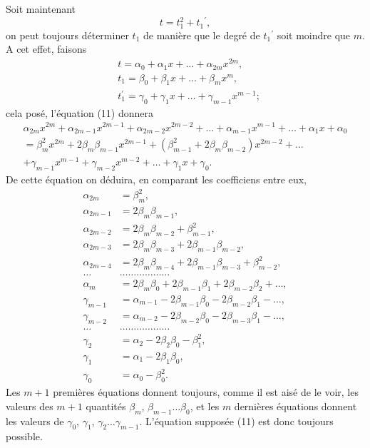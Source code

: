 \documentclass[oneside, 12 pt, leqno]{memoir}
\begin{document}
Soit maintenant
\[\tag{11}t=t_1^2+{t_1}^{\prime},\]
on peut toujours déterminer \(t_1\) de manière que le degré de \(t_1{ }^{\prime}\) soit moindre que \(m\). A cet effet, faisons
\[\begin{aligned}
& t=\alpha_0+\alpha_1 x+\dots+\alpha_{2 m} x^{2 m}, \\
& t_1=\beta_0+\beta_1 x+\dots+\beta_m x^m, \\
& t_1^{\prime}=\gamma_0+\gamma_1 x+\dots+\gamma_{m-1} x^{m-1};
\end{aligned}\]
cela posé, l'équation (11) donnera
\[\begin{gathered}
\alpha_{2 m} x^{2 m}+\alpha_{2 m-1} x^{2 m-1}+\alpha_{2 m-2} x^{2 m-2}+\dots+\alpha_{m-1} x^{m-1}+\dots+\alpha_1 x+\alpha_0 \\
=\beta_m^2 x^{2 m}+2 \beta_m \beta_{m-1} x^{2 m-1}+\left(\beta_{m-1}^2+2 \beta_m \beta_{m-2}\right) x^{2 m-2}+\dots \\
+\gamma_{m-1} x^{m-1}+\gamma_{m-2} x^{m-2}+\dots+\gamma_1 x+\gamma_0.
\end{gathered}\]
De cette équation on déduira, en comparant les coefficiens entre eux,
\[\begin{aligned}
\alpha_{2 m} & =\beta_m^2, \\
\alpha_{2 m-1} & =2 \beta_m \beta_{m-1}, \\
\alpha_{2 m-2} & =2 \beta_m \beta_{m-2}+\beta_{m-1}^2, \\
\alpha_{2 m-3} & =2 \beta_m \beta_{m-3}+2 \beta_{m-1} \beta_{m-2}, \\
\alpha_{2 m-4} & =2 \beta_m \beta_{m-4}+2 \beta_{m-1} \beta_{m-3}+\beta_{m-2}^2, \\
\dots & \dots \dots \dots \dots \dots \dots \\
\alpha_m & =2 \beta_m \beta_0+2 \beta_{m-1} \beta_1+2 \beta_{m-2} \beta_2+\dots , \\
\gamma_{m-1} & =\alpha_{m-1}-2 \beta_{m-1} \beta_0-2 \beta_{m-2} \beta_1 - \dots ,\\
\gamma_{m-2} & =\alpha_{m-2}-2 \beta_{m-2} \beta_0-2 \beta_{m-3} \beta_1- \dots , \\
\dots & \dots \dots \dots \dots \dots \dots \\
\gamma_2 & =\alpha_2-2 \beta_2 \beta_0-\beta_1^2, \\
\gamma_1 & =\alpha_1-2 \beta_1 \beta_0, \\
\gamma_0 & =\alpha_0-\beta_0^2.\end{aligned}\]
Les \(m+1\) premières équations donnent toujours, comme il est aisé de le voir, les valeurs des \(m+1\) quantités \(\beta_m\), \(\beta_{m-1} \dots \beta_0\), et les \(m\) dernières équations donnent les valeurs de \(\gamma_0\), \(\gamma_1\), \(\gamma_2 \dots \gamma_{m-1}\). L'équation supposée (11) est donc toujours possible.
\end{document}
